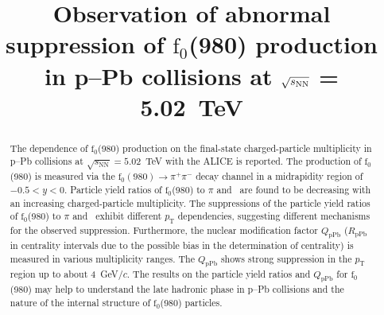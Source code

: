 \documentclass[ALICE,manyauthors]{cernphprep}
\begin{document}
\begin{titlepage}

\PHyear{}
\PHdate{\today}
%

\title{Observation of abnormal suppression of $\mathrm{f}_{0}$(980) production \\in p--Pb collisions at $\sqrt{s_{\rm NN}}$ = 5.02~TeV }

\ShortTitle{}   %


\begin{abstract}
The dependence of $\mathrm{f}_{0}$(980) production on the final-state charged-particle multiplicity in p--Pb collisions at $\sqrt{s_{\mathrm{NN}}} = 5.02$~TeV with the ALICE is reported. The production of $\mathrm{f}_{0}$(980) is measured via the $\mathrm{f}_0 (980) \rightarrow \pi^{+}\pi^{-}$ decay channel in a midrapidity region of $-0.5<y<0$. Particle yield ratios of $\mathrm{f}_{0}$(980) to $\pi$ and \kstar~are found to be decreasing with an increasing charged-particle multiplicity. The suppressions of the particle yield ratios of $\mathrm{f}_{0}$(980) to $\pi$ and \kstar~exhibit different $p_{\mathrm{T}}$ dependencies, suggesting different mechanisms for the observed suppression. Furthermore, the nuclear modification factor $Q_{\mbox{pPb}}$ ($R_{\mbox{pPb}}$ in centrality intervals due to the possible bias in the determination of centrality) is measured in various multiplicity ranges. The $Q_{\mbox{pPb}}$ shows strong suppression in the  $p_{\mathrm{T}}$ region up to about 4~GeV/$c$. The results on the particle yield ratios and $Q_{\mbox{pPb}}$ for $\mathrm{f}_{0}$(980) may help to understand the late hadronic phase in p--Pb collisions and the nature of the internal structure of $\mathrm{f}_{0}$(980) particles.



\color{black}

\end{abstract}
 
\end{titlepage}

\setcounter{page}{2}
\end{document}
